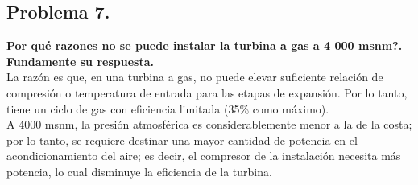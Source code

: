 \documentclass[a4paper,12pt]{article}
\begin{document}
\subsection*{Problema 7.}
    \textbf{Por qué razones no se puede instalar la turbina a gas a 4 000 msnm?. Fundamente su respuesta.}\\[4pt]
La razón es que, en una turbina a gas, no puede elevar suficiente relación de compresión o temperatura de entrada para las etapas de expansión. Por lo tanto, tiene un ciclo de gas con eficiencia limitada (35\% como máximo).\\
A 4000 msnm, la presión atmosférica es considerablemente menor a la de la costa; por lo tanto, se requiere destinar una mayor cantidad de potencia en el acondicionamiento del aire; es decir, el compresor de la instalación necesita más potencia, lo cual disminuye la eficiencia de la turbina.
\end{document}

